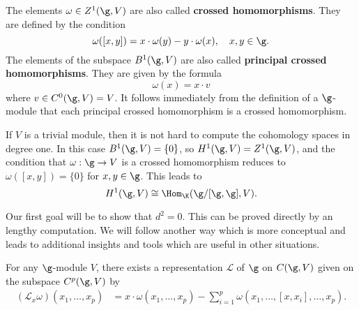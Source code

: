 \begin{example}
The elements $\omega\in Z^1(\g,V)$ are also called \textbf{crossed homomorphisms}. They are defined by the condition
\[\omega([x,y])=x\cdot\omega(y)-y\cdot\omega(x),\quad x,y\in\g.\]
The elements of the subspace $B^1(\g,V)$ are also called \textbf{principal
crossed homomorphisms}. They are given by the formula
\[\omega(x)=x\cdot v\]
where $v\in C^0(\g,V)=V$. It follows immediately from the definition of a
$\g$-module that each principal crossed homomorphism is a crossed homomorphism.\par
If $V$ is a trivial module, then it is not hard to compute the cohomology spaces in degree one. In this case $B^1(\g,V)=\{0\}$, so $H^1(\g,V)=Z^1(\g,V)$, and the condition that $\omega:\g\to V$ is a crossed homomorphism reduces to $\omega([x,y])=\{0\}$ for $x,y\in\g$. This leads to
\[H^1(\g,V)\cong\Hom_{\K}(\g/[\g,\g],V).\]
\end{example}
Our first goal will be to show that $d^2=0$. This can be proved directly by an lengthy computation. We will follow another way which is more conceptual and leads to additional insights and tools which are useful in other situations.
\begin{proposition}
For any $\g$-module $V$, there exists a representation $\mathcal{L}$ of $\g$ on $C(\g,V)$ given on the subspace $C^p(\g,V)$ by
\begin{align*}
(\mathcal{L}_x\omega)(x_1,\dots,x_p)&=x\cdot\omega(x_1,\dots,x_p)-\sum_{i=1}^p\omega(x_1,\dots,[x,x_i],\dots,x_p).
\end{align*}
\end{proposition}
